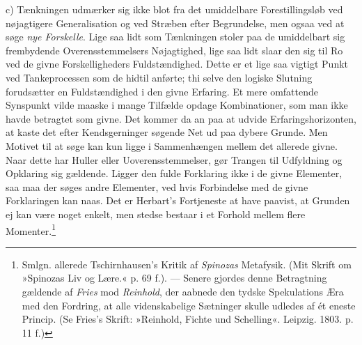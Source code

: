 \documentclass[12pt,a4paper,openany]{book}
\begin{document}
c) Tænkningen udmærker sig ikke blot fra det umiddelbare
Forestillingsløb ved nøjagtigere Generalisation og ved Stræben efter
Begrundelse, men ogsaa ved at søge \emph{nye Forskelle}. Lige saa lidt
som Tænkningen stoler paa de umiddelbart sig frembydende
Overensstemmelsers Nøjagtighed, lige saa lidt slaar den sig til Ro ved
de givne Forskelligheders Fuldstændighed. Dette er et lige saa vigtigt
Punkt ved Tankeprocessen som de hidtil anførte; thi selve den logiske
Slutning forudsætter en Fuldstændighed i den givne Erfaring. Et mere
omfattende Synspunkt vilde maaske i mange Tilfælde opdage Kombinationer,
som man ikke havde betragtet som givne. Det kommer da an paa at udvide
Erfaringshorizonten, at kaste det efter Kendsgerninger søgende Net ud
paa dybere Grunde. Men Motivet til at søge kan kun ligge i Sammenhængen
mellem det allerede givne. Naar dette har Huller eller
Uoverensstemmelser, gør Trangen til Udfyldning og Opklaring sig
gældende. Ligger den fulde Forklaring ikke i de givne Elementer, saa maa
der søges andre Elementer, ved hvis Forbindelse med de givne
Forklaringen kan naas. Det er Herbart’s Fortjeneste at have paavist, at
Grunden ej kan være noget enkelt, men stedse bestaar i et Forhold mellem
flere Momenter.\footnote[1]{Smlgn. allerede Tschirnhausen’s Kritik af
\emph{Spinozas} Metafysik. (Mit Skrift om »Spinozas Liv og Lære.« p. 69
f.). --- Senere gjordes denne Betragtning gældende af \emph{Fries} mod
\emph{Reinhold}, der aabnede den tydske Spekulations Æra med den
Fordring, at alle videnskabelige Sætninger skulle udledes af ét eneste
Princip. (Se Fries’s Skrift: »Reinhold, Fichte und Schelling«. Leipzig.
1803. p. 11 f.)}
\end{document}

